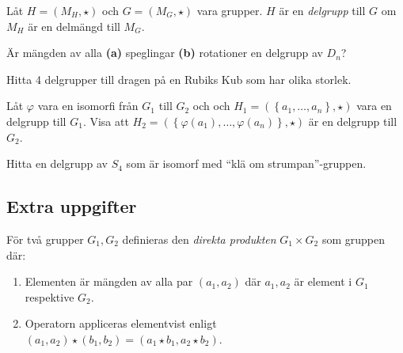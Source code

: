 \documentclass[11pt,fleqn]{book} %
\begin{document}

\begin{definition}
  Låt \(H = (M_H,  \star)\) och \(G = (M_G,  \star)\) vara grupper. \(H\) är en \textit{delgrupp} till \(G\) om \(M_H\) är en delmängd till \(M_G\).
\end{definition}

\begin{problem}
  Är mängden av alla \textbf{(a)} speglingar \textbf{(b)} rotationer en delgrupp av \(D_n\)?
\end{problem}

\begin{problem}
  Hitta 4 delgrupper till dragen på en Rubiks Kub som har olika storlek.
\end{problem}

\begin{problem}
  Låt \(\varphi \) vara en isomorfi från \(G_1\) till \(G_2\) och och \(H_1 = (\left\{a_1, \dots, a_n \right\},  \star )\) vara en delgrupp till \(G_1\). Visa att \(H_2 = ( \left\{\varphi (a_1), \dots, \varphi(a_n)\right\},  \star )\) är en delgrupp till \(G_2\).
\end{problem}

\begin{problem}
  Hitta en delgrupp av \(S_4\) som är isomorf med ``klä om strumpan''-gruppen.
\end{problem}


\subsection*{Extra uppgifter}


\begin{definition}
  För två grupper \(G_1, G_2\) definieras den \textit{direkta produkten} \(G_1 \times G_2\) som gruppen där:
  \begin{enumerate}
    \item Elementen är mängden av alla par \((a_1, a_2)\) där \(a_1, a_2\) är element i \(G_1\) respektive \(G_2\).
    \item Operatorn appliceras elementvist enligt \((a_1, a_2)  \star (b_1, b_2) = (a_1  \star b_1, a_2  \star b_2)\).
  \end{enumerate}
\end{definition}
\end{document}
